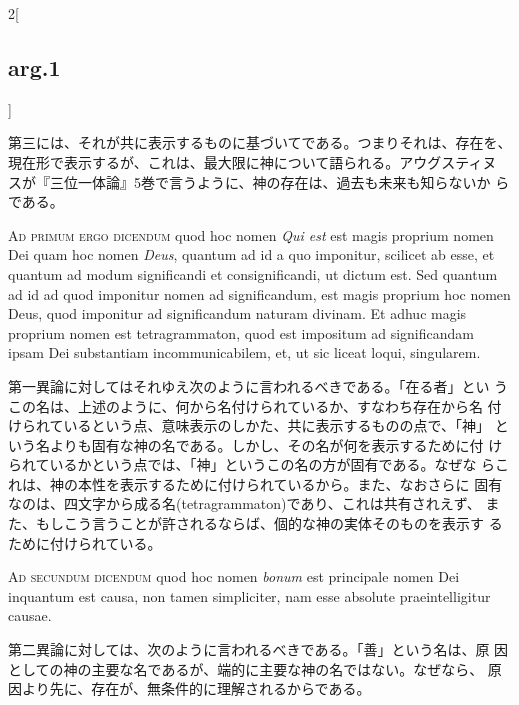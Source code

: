 \documentclass[paper=a4paper,fontsize=10pt,jafontsize=9pt,titlepage]{jlreq}
\begin{document}
\begin{paracol}{2}[\subsection{arg.1}]
\switchcolumn

第三には、それが共に表示するものに基づいてである。つまりそれは、存在を、
現在形で表示するが、これは、最大限に神について語られる。アウグスティヌ
スが『三位一体論』5巻で言うように、神の存在は、過去も未来も知らないか
らである。

\switchcolumn*[\subsection{ad.1}]

{\scshape Ad primum ergo dicendum} quod hoc nomen {\itshape Qui est}
est magis proprium nomen Dei quam hoc nomen {\itshape Deus}, quantum
ad id a quo imponitur, scilicet ab esse, et quantum ad modum
significandi et consignificandi, ut dictum est. Sed quantum ad id ad
quod imponitur nomen ad significandum, est magis proprium hoc nomen
Deus, quod imponitur ad significandum naturam divinam. Et adhuc magis
proprium nomen est tetragrammaton, quod est impositum ad significandam
ipsam Dei substantiam incommunicabilem, et, ut sic liceat loqui,
singularem.

\switchcolumn

第一異論に対してはそれゆえ次のように言われるべきである。「在る者」とい
うこの名は、上述のように、何から名付けられているか、すなわち存在から名
付けられているという点、意味表示のしかた、共に表示するものの点で、「神」
という名よりも固有な神の名である。しかし、その名が何を表示するために付
けられているかという点では、「神」というこの名の方が固有である。なぜな
らこれは、神の本性を表示するために付けられているから。また、なおさらに
固有なのは、四文字から成る名(tetragrammaton)であり、これは共有されえず、
また、もしこう言うことが許されるならば、個的な神の実体そのものを表示す
るために付けられている。

\switchcolumn*[\subsection{ad.2}]

{\scshape Ad secundum dicendum} quod hoc nomen {\itshape bonum} est
principale nomen Dei inquantum est causa, non tamen simpliciter, nam
esse absolute praeintelligitur causae.

\switchcolumn

第二異論に対しては、次のように言われるべきである。「善」という名は、原
因としての神の主要な名であるが、端的に主要な神の名ではない。なぜなら、
原因より先に、存在が、無条件的に理解されるからである。

\switchcolumn*[\subsection{ad.3}]


\end{paracol}
\end{document}
